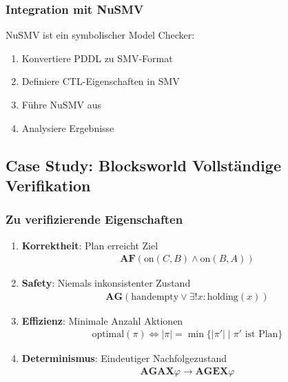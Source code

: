 ﻿\documentclass[a4paper,12pt]{article}
\theoremstyle{definition}
\begin{document}
\subsubsection{Integration mit NuSMV}

NuSMV ist ein symbolischer Model Checker:

\begin{enumerate}
	\item Konvertiere PDDL zu SMV-Format
	\item Definiere CTL-Eigenschaften in SMV
	\item Führe NuSMV aus
	\item Analysiere Ergebnisse
\end{enumerate}

\subsection{Case Study: Blocksworld Vollständige Verifikation}

\subsubsection{Zu verifizierende Eigenschaften}

\begin{enumerate}
	\item \textbf{Korrektheit}: Plan erreicht Ziel
	\begin{align}
	\mathbf{AF}(\text{on}(C, B) \land \text{on}(B, A))
	\end{align}
	
	\item \textbf{Safety}: Niemals inkonsistenter Zustand
	\begin{align}
	\mathbf{AG}(\text{handempty} \lor \exists! x: \text{holding}(x))
	\end{align}
	
	\item \textbf{Effizienz}: Minimale Anzahl Aktionen
	\begin{align}
	\text{optimal}(\pi) \iff |\pi| = \min\{|\pi'| \mid \pi' \text{ ist Plan}\}
	\end{align}
	
	\item \textbf{Determinismus}: Eindeutiger Nachfolgezustand
	\begin{align}
	\mathbf{AG}\mathbf{AX}\varphi \to \mathbf{AG}\mathbf{EX}\varphi
	\end{align}
\end{enumerate}
\end{document}
